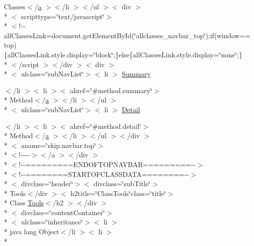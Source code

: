 \begin{DoxyCompactItemize}
\item 
Classes$<$/\hyperlink{style_8css_a5e8981582017bb8b84c21f148345d1f7}{a} $>$$<$/li $>$$<$/ul $>$$<$ div $>$\\*
$<$ scripttype=\char`\"{}text/javascript\char`\"{}$>$\\*
$<$!-\/-\/all\-Classes\-Link=document.\-get\-Element\-By\-Id(\char`\"{}allclasses\-\_\-navbar\-\_\-top\char`\"{});if(window==top)\{all\-Classes\-Link.\-style.\-display=\char`\"{}block\char`\"{};\}else\{all\-Classes\-Link.\-style.\-display=\char`\"{}none\char`\"{};\}\\*
$<$/script $>$$<$/div $>$$<$ div $>$\\*
$<$ ulclass=\char`\"{}sub\-Nav\-List\char`\"{}$>$$<$ li $>$ \hyperlink{_tools_8html_a6f9ab45abc9b0679dc1b132fbacfc681}{Summary}
\item 
$<$/li $>$$<$ li $>$$<$ ahref=\char`\"{}\#method.\-summary\char`\"{}$>$\\*
 Method$<$/\hyperlink{style_8css_a5e8981582017bb8b84c21f148345d1f7}{a} $>$$<$/li $>$$<$/ul $>$\\*
$<$ ulclass=\char`\"{}sub\-Nav\-List\char`\"{}$>$$<$ li $>$ \hyperlink{_tools_8html_a1e04b5ec07bcd5281e26dcd40e5b3a94}{Detail}
\item 
$<$/li $>$$<$ li $>$$<$ ahref=\char`\"{}\#method.\-detail\char`\"{}$>$\\*
 Method$<$/\hyperlink{style_8css_a5e8981582017bb8b84c21f148345d1f7}{a} $>$$<$/li $>$$<$/ul $>$$<$/div $>$\\*
$<$ aname=\char`\"{}skip.\-navbar.\-top\char`\"{}$>$\\*
$<$!-\/-\/-\/-\/$>$$<$/a $>$$<$/div $>$\\*
$<$!-\/-\/=========E\-N\-D\-O\-F\-T\-O\-P\-N\-A\-V\-B\-A\-R=========-\/-\/$>$\\*
$<$!-\/-\/========S\-T\-A\-R\-T\-O\-F\-C\-L\-A\-S\-S\-D\-A\-T\-A========-\/-\/$>$\\*
$<$ divclass=\char`\"{}header\char`\"{}$>$$<$ divclass=\char`\"{}sub\-Title\char`\"{}$>$\\*
 Tools$<$/div $>$$<$ h2title=\char`\"{}Class\-Tools\char`\"{}class=\char`\"{}title\char`\"{}$>$\\*
 Class \hyperlink{_tools_8html_a5bc1ab07e2d40a6a76f9e1602174b09b}{Tools}$<$/h2 $>$$<$/div $>$\\*
$<$ divclass=\char`\"{}content\-Container\char`\"{}$>$\\*
$<$ ulclass=\char`\"{}inheritance\char`\"{}$>$$<$ li $>$\\*
 java lang Object$<$/li $>$$<$ li $>$\\*
$$
\end{DoxyCompactItemize}
